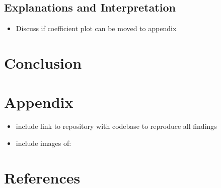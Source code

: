 \documentclass[12pt, letterpaper]{article}
\begin{document}

\subsection{Explanations and Interpretation} %

\begin{itemize}
    \item Discuss if coefficient plot can be moved to appendix
\end{itemize}


\section{Conclusion} %


\section{Appendix}
\begin{itemize}
    \item include link to repository with codebase to reproduce all findings
    \item include images of: %
\end{itemize}


\section{References}
\end{document}
